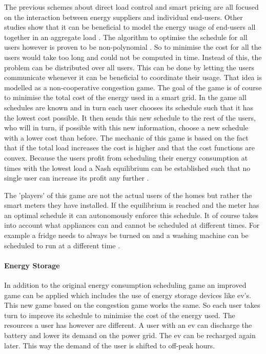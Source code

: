 The previous schemes about direct load control and smart pricing are all focused on the interaction between energy suppliers and individual end-users. Other studies show that it can be beneficial to model the energy usage of end-users all together in an aggregate load \cite{Mohsenian-RadWongJatskevichEtAl2010a, SalinasLiLi2013, ZhuTangLambotharanEtAl2011}. The algorithm to optimise the schedule for all users however is proven to be non-polynomial \cite{CaronKesidis2010}. So to minimise the cost for all the users would take too long and could not be computed in time. Instead of this, the problem can be distributed over all users. This can be done by letting the users communicate whenever it can be beneficial to coordinate their usage. That idea is modelled as a non-cooperative congestion game. The goal of the game is of course to minimise the total cost of the energy used in a smart grid. In the game all schedules are known and in turn each user chooses its schedule such that it has the lowest cost possible. It then sends this new schedule to the rest of the users, who will in turn, if possible with this new information, choose a new schedule with a lower cost than before. The mechanic of this game is based on the fact that if the total load increases the cost is higher and that the cost functions are convex. Because the users profit from scheduling their energy consumption at times with the lowest load a Nash equilibrium can be established such that no single user can increase its profit any further \cite{Mohsenian-RadWongJatskevichEtAl2010a, ZhuTangLambotharanEtAl2011, IbarsNavarroGiupponi2010}.

The 'players' of this game are not the actual users of the homes but rather the smart meters they have installed. If the equilibrium is reached and the meter has an optimal schedule it can autonomously enforce this schedule. It of course takes into account what appliances can and cannot be scheduled at different times. For example a fridge needs to always be turned on and a washing machine can be scheduled to run at a different time \cite{DepuruWangDevabhaktuni2011a}. 

\paragraph{Energy Storage}
In addition to the original energy consumption scheduling game an improved game can be applied which includes the use of energy storage devices like \ac{ev}'s. This new game based on the congestion game works the same. So each user takes turn to improve its schedule to minimise the cost of the energy used. The resources a user has however are different. A user with an \ac{ev} can discharge the battery and lower its demand on the power grid. The \ac{ev} can be recharged again later. This way the demand of the user is shifted to off-peak hours. 
